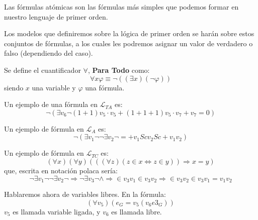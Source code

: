\documentclass[12pt]{report}
\theoremstyle{largebreak}
\begin{document}
    \begin{obs}
        Las fórmulas atómicas son las fórmulas más simples que podemos formar en nuestro lenguaje de primer orden.
    \end{obs}

    Los modelos que definiremos sobre la lógica de primer orden se harán sobre estos conjuntos de fórmulas, a los cuales les podremos asignar un valor de verdadero o falso (dependiendo del caso).

    \begin{mydef}
        Se define el cuantificador $\forall$, \textbf{Para Todo} como:
        \begin{equation*}
            \forall x\varphi \equiv \neg((\exists x)(\neg\varphi))
        \end{equation*}
        siendo $x$ una variable y $\varphi$ una fórmula.
    \end{mydef}

    \begin{exa}
        Un ejemplo de una fórmula en $\mathcal{L}_{TA}$ es:
        \begin{equation*}
            \neg(\exists v_6\neg (1+1)v_5\cdot v_5+(1+1+1)v_5\cdot v_7+v_7=0)
        \end{equation*}
    \end{exa}

    \begin{exa}
        Un ejemplo de fórmula en $\mathcal{L}_A$ es:
        \begin{equation*}
            \neg(\exists v_1\neg\neg \exists v_2\neg=+v_1Scv_2Sc+v_1v_2)
        \end{equation*}
    \end{exa}

    \begin{exa}
        Un ejemplo de fórmula en $\mathcal{L}_{TC}$ es:
        \begin{equation*}
            (\forall x)(\forall y)(((\forall z)( z\in x\iff z\in y))\Rightarrow x=y)
        \end{equation*}
        que, escrita en notación polaca sería:
        \begin{equation*}
            \neg\exists v_1\neg\neg\exists v_2\neg \Rightarrow\neg \exists v_3\neg\land\Rightarrow \in v_3v_1\in v_3v_2\Rightarrow \in v_3v_2\in v_3v_1=v_1v_2
        \end{equation*}
    \end{exa}

    Hablaremos ahora de variables libres. En la fórmula:
    \begin{equation*}
        (\forall v_5)(e_G=v_5(v_6e3_G))
    \end{equation*}
    $v_5$ es llamada variable ligada, y $v_6$ es llamada libre.
    
\end{document}
